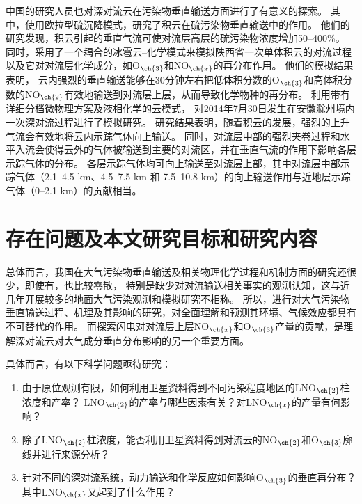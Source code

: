 中国的研究人员也对深对流云在污染物垂直输送方面进行了有意义的探索。
其中，\citet{GaoHuiWang.1998}使用欧拉型硫沉降模式，研究了积云在硫污染物垂直输送中的作用。
他们的研究发现，积云引起的垂直气流可使对流层高层的硫污染物浓度增加50--400\%。
同时，\citet{LiBing.1999,LiBing.2001}采用了一个耦合的冰雹云--化学模式来模拟陕西省一次单体积云的对流过程以及它对对流层化学成分，如O$_{\ch{3}}$和NO$_{\ch{x}}$的再分布作用。
他们的模拟结果表明，
云内强烈的垂直输送能够在30分钟左右把低体积分数的O$_{\ch{3}}$和高体积分数的NO$_{\ch{2}}$有效地输送到对流层上层，从而导致化学物种的再分布。
\citet{HuJiaYing.2019}利用带有详细分档微物理方案及液相化学的云模式，
对2014年7月30日发生在安徽滁州境内一次深对流过程进行了模拟研究。
研究结果表明，随着积云的发展，强烈的上升气流会有效地将云内示踪气体向上输送。
同时，对流层中部的强烈夹卷过程和水平入流会使得云外的气体被输送到主要的对流区，并在垂直气流的作用下影响各层示踪气体的分布。
各层示踪气体均可向上输送至对流层上部，其中对流层中部示踪气体（2.1--4.5 km、4.5--7.5 km 和 7.5--10.8 km）的向上输送作用与近地层示踪气体（0--2.1 km）的贡献相当。




\section{存在问题及本文研究目标和研究内容}

总体而言，我国在大气污染物垂直输送及相关物理化学过程和机制方面的研究还很少，即使有，也比较零散，
特别是缺少对对流输送相关事实的观测认知，这与近几年开展较多的地面大气污染观测和模拟研究不相称。
所以，进行对大气污染物垂直输送过程、机理及其影响的研究，对全面理解和预测其环境、气候效应都具有不可替代的作用。
而探索闪电对对流层上层NO$_{\ch{x}}$和O$_{\ch{3}}$产量的贡献，是理解深对流云对大气成分垂直分布影响的另一个重要方面。

具体而言，有以下科学问题亟待研究：

\begin{enumerate}[label=（\arabic*）, labelindent=\parindent, nosep, leftmargin=0pt, widest=0, itemindent=*, topsep=0pt, partopsep=0pt, parsep=0pt]

\item 由于原位观测有限，如何利用卫星资料得到不同污染程度地区的LNO$_{\ch{2}}$柱浓度和产率？
LNO$_{\ch{2}}$的产率与哪些因素有关？对LNO$_{\ch{x}}$的产量有何影响？

\item 除了LNO$_{\ch{2}}$柱浓度，能否利用卫星资料得到对流云的NO$_{\ch{2}}$和O$_{\ch{3}}$廓线并进行来源分析？

\item 针对不同的深对流系统，动力输送和化学反应如何影响O$_{\ch{3}}$的垂直再分布？其中LNO$_{\ch{x}}$又起到了什么作用？

\end{enumerate}

